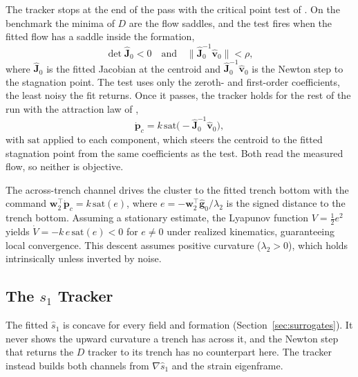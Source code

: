 \documentclass[lettersize,journal]{IEEEtran}
\begin{document}
The tracker stops at the end of the pass with the critical point test of
\cite{10}. On the benchmark the minima of $D$ are the flow saddles, and
the test fires when the fitted flow has a saddle inside the formation,
\begin{equation}
    \det\hat{\mathbf{J}}_0 < 0
    \quad\text{and}\quad
    \bigl\|\hat{\mathbf{J}}_0^{-1}\hat{\mathbf{v}}_0\bigr\| < \rho,
    \label{eq:d_capture}
\end{equation}
where $\hat{\mathbf{J}}_0$ is the fitted Jacobian at the centroid and
$\hat{\mathbf{J}}_0^{-1}\hat{\mathbf{v}}_0$ is the Newton step to the
stagnation point. The test uses only the zeroth- and first-order
coefficients, the least noisy the fit returns. Once it passes, the tracker
holds for the rest of the run with the attraction law of \cite{10},
\begin{equation}
    \dot{\mathbf{p}}_c = k\,\mathrm{sat}\bigl(-\hat{\mathbf{J}}_0^{-1}\hat{\mathbf{v}}_0\bigr),
    \label{eq:d_hold}
\end{equation}
with $\mathrm{sat}$ applied to each component, which steers the centroid to
the fitted stagnation point from the same coefficients as the test. Both
read the measured flow, so neither is objective.

The across-trench channel drives the cluster to the fitted trench bottom
with the command $\mathbf{w}_2^\top\dot{\mathbf{p}}_c = k\,\mathrm{sat}(e)$,
where $e = -\mathbf{w}_2^\top\hat{\mathbf{g}}_0/\lambda_2$ is the signed
distance to the trench bottom. Assuming a stationary estimate, the
Lyapunov function $V = \tfrac{1}{2}e^2$ yields $\dot{V} = -k\,e\,\mathrm{sat}(e) < 0$ for
$e \neq 0$ under realized kinematics, guaranteeing local convergence. This descent assumes positive
curvature ($\lambda_2 > 0$), which holds intrinsically unless inverted by
noise.

\subsection{The $s_1$ Tracker}
\label{sec:s1_controller}

The fitted $\hat{s}_1$ is concave for every field and formation
(Section~\ref{sec:surrogates}). It never shows the upward curvature a
trench has across it, and the Newton step that returns the $D$ tracker to
its trench has no counterpart here. The tracker instead builds both
channels from $\nabla\hat{s}_1$ and the strain eigenframe.
\end{document}
